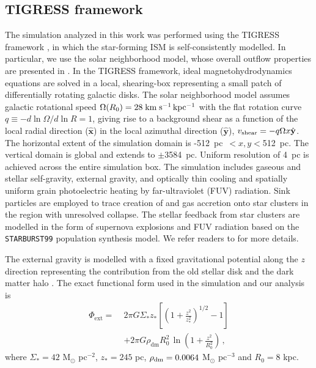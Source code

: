 \documentclass[twocolumn]{aastex62}
\newcommand\kms{\; {\rm km}\;{\rm s}^{-1}}
\newcommand\rbrackets[1]{\left({#1}\right)}
\newcommand\sbrackets[1]{\left[{#1}\right]}
\newcommand\xhat{\hat{\mathbf{x}} }
\newcommand\yhat{\hat{\mathbf{y}} }
\begin{document}
\subsection{TIGRESS framework}\label{subsec:tigress_summary}
The simulation analyzed in this work was performed using the TIGRESS framework \citep{Kim&Ostriker17}, in which the star-forming ISM is self-consistently modelled. In particular, we use the solar neighborhood model, whose overall outflow properties are presented in \citep{Kim&Ostriker18}. In the TIGRESS framework, ideal magnetohydrodynamics equations are solved in a local, shearing-box representing a small patch of differentially rotating galactic disks. The solar neighborhood model assumes galactic rotational speed $\Omega(R_0)=28\kms{\,\rm kpc^{-1}}$ with the flat rotation curve $q\equiv -d\ln\Omega/d\ln R = 1$, giving rise to a background shear as a function of the local radial direction ($\xhat$) in the local azimuthal direction ($\yhat$), $v_{\rm shear}=-q\Omega x \yhat$. The horizontal extent of the simulation domain is -512~pc~$<x,y<$512~pc. The vertical domain is global and extends to $\pm$3584~pc. Uniform resolution of 4~pc is achieved across the entire simulation box. The simulation includes gaseous and stellar self-gravity, external gravity, and optically thin cooling and spatially uniform grain photoelectric heating by far-ultraviolet (FUV) radiation. Sink particles are employed to trace creation of and gas accretion onto star clusters in the region with unresolved collapse. The stellar feedback from star clusters are modelled in the form of supernova explosions and FUV radiation based on the {\tt STARBURST99} population synthesis model. We refer readers to \citet{Kim&Ostriker17} for more details.

The external gravity is modelled with a fixed gravitational potential along the $z$ direction representing the contribution from the old stellar disk and the dark matter halo  \citep{Kujiken&Gilmore}. The exact functional form used in the simulation and our analysis is  
\begin{equation}
\begin{split}
\Phi_{\mathrm{ext}} = \; & 2 \pi G \Sigma_*z_* \sbrackets{ \rbrackets{ 1 + \frac{z^2}{z_*^2}}^{1/2} -1}\\
&+ 2 \pi G \rho_\mathrm{dm} R_0^2 \,\ln\rbrackets{ 1 + \frac{z^2}{R_0^2}}\,,
\end{split}
\label{eqn:pot}
\end{equation}
where $\Sigma_* = 42$ M$_{\odot}$ pc$^{-2}$, $z_*=245$ pc, $\rho_{\rm{dm}} = 0.0064$ M$_{\odot}$ pc$^{-3}$ and $R_0 = 8$ kpc.
\end{document}
